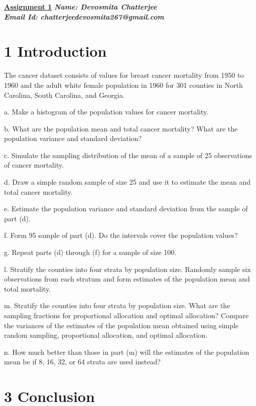 \documentclass[10pt]{article}
\begin{document}
\graphicspath{ {figures/} }
\onehalfspacing
\setlength{\unitlength}{5mm} \baselineskip 0.6cm
\setcounter{page}{2} 
\begin{center}
\Large{\textbf{\underline{Assignment 1}}}
\vskip 100pt
\Large{\textbf{}}
\vskip 50pt
\large{\textit{\textbf{Name: Devosmita Chatterjee}}}\\
\large{\textit{\textbf{Email Id: chatterjeedevosmita267@gmail.com}}}
\end{center}
\newpage
\title{\bf{{}}}
\date{}%
\maketitle

\section*{{\large{1\hskip 20pt Introduction}}}
The cancer dataset consists of values for breast cancer mortality from 1950 to 1960 and the adult white female population in 1960 for 301 counties in North Carolina, South Carolina, and Georgia.

a. Make a histogram of the population values for cancer mortality.

b. What are the population mean and total cancer mortality? What are the population variance and standard deviation?

c. Simulate the sampling distribution of the mean of a sample of 25 observations
of cancer mortality.

d. Draw a simple random sample of size 25 and use it to estimate the mean and
total cancer mortality.

e. Estimate the population variance and standard deviation from the sample of
part (d).

f. Form 95%
sample of part (d). Do the intervals cover the population values?

g. Repeat parts (d) through (f) for a sample of size 100.

l. Stratify the counties into four strata by population size. Randomly sample six
observations from each stratum and form estimates of the population mean
and total mortality.

m. Stratify the counties into four strata by population size. What are the sampling fractions for proportional allocation and optimal allocation? Compare
the variances of the estimates of the population mean obtained using simple
random sampling, proportional allocation, and optimal allocation.

n. How much better than those in part (m) will the estimates of the population
mean be if 8, 16, 32, or 64 strata are used instead?
\section*{{\large{3\hskip 20pt Conclusion}}}

\footnotesize
\begin{thebibliography}{99}











\end{thebibliography}
\end{document}
